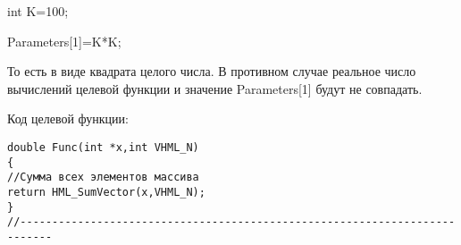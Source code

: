 int K=100;

Parameters[1]=K*K;

То есть в виде квадрата целого числа. В противном случае реальное число вычислений целевой функции и значение Parameters[1] будут не совпадать.

Код целевой функции:
\begin{lstlisting}[caption=Оптимизируемая функция]
double Func(int *x,int VHML_N)
{
//Сумма всех элементов массива
return HML_SumVector(x,VHML_N);
}
//---------------------------------------------------------------------------
\end{lstlisting}
